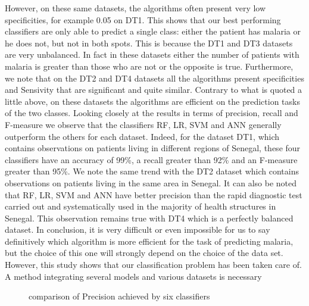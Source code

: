 However, on these same datasets, the algorithms often present very low specificities, for example 0.05 on DT1. This shows that our best performing classifiers are only able to predict a single class: either the patient has malaria or he does not, but not in both spots. This is because the DT1 and DT3 datasets are very unbalanced. In fact in these datasets either the number of patients with malaria is greater than those who are not or the opposite is true. Furthermore, we note that on the DT2 and DT4 datasets all the algorithms present specificities and Sensivity that are significant and quite similar. Contrary to what is quoted a little above, on these datasets the algorithms are efficient on the prediction tasks of the two classes. Looking closely at the results in terms of precision, recall and F-measure we observe that the classifiers RF, LR, SVM and ANN generally outperform the others for each dataset. Indeed, for the dataset DT1, which contains observations on patients living in different regions of Senegal, these four classifiers have an accuracy of 99\%, a recall greater than 92\% and an F-measure greater than 95\%. We note the same trend with the DT2 dataset which contains observations on patients living in the same area in Senegal. It can also be noted that RF, LR, SVM and ANN have better precision than the rapid diagnostic test carried out and systematically used in the majority of health structures in Senegal. This observation remains true with DT4 which is a perfectly balanced dataset. In conclusion, it is very difficult or even impossible for us to say definitively which algorithm is more efficient for the task of predicting malaria, but the choice of this one will strongly depend on the choice of the data set. However, this study shows that our classification problem has been taken care of. A method integrating several models and various datasets is necessary

\begin{figure}
\caption{comparison of Precision achieved by six classifiers}

\end{figure}


